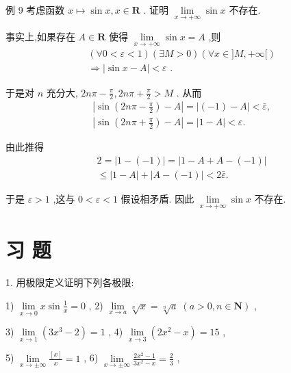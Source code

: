 例 9 考虑函数 $x \mapsto  \sin x,x \in  \mathbf{R}$ . 证明 $\mathop{\lim }\limits_{{x \rightarrow   + \infty }}\sin x$ 不存在.

事实上,如果存在 $A \in  \mathbf{R}$ 使得 $\mathop{\lim }\limits_{{x \rightarrow   + \infty }}\sin x = A$ ,则
\begin{align*}
	&\left( {\forall 0 < \varepsilon  < 1}\right) \left( {\exists M > 0}\right) \left( {\forall x \in  \rbrack M, + \infty \lbrack }\right)\\
	&\Rightarrow  \left| {\sin x - A}\right|  < \varepsilon \text{ . }
\end{align*}

于是对 $n$ 充分大, ${2n\pi } - \frac{\pi }{2},{2n\pi } + \frac{\pi }{2} > M$ . 从而
\begin{align*}
	&\left| {\sin \left( {{2n\pi } - \frac{\pi }{2}}\right)  - A}\right|  = \left| {\left( {-1}\right)  - A}\right|  < \bar{\varepsilon },\\
	&\left| {\sin \left( {{2n\pi } + \frac{\pi }{2}}\right)  - A}\right|  = \left| {1 - A}\right|  < \varepsilon .
\end{align*}

由此推得
\begin{align*}
	&2 = \left| {1 - \left( {-1}\right) }\right|  = \left| {1 - A + A - \left( {-1}\right) }\right|\\
	&\leq  \left| {1 - A}\right|  + \left| {A - \left( {-1}\right) }\right|  < 2\bar{\varepsilon }.
\end{align*}

于是 $\varepsilon  > 1$ ,这与 $0 < \varepsilon  < 1$ 假设相矛盾. 因此 $\mathop{\lim }\limits_{{x \rightarrow   + \infty }}\sin x$ 不存在.

\section*{习 题}

1. 用极限定义证明下列各极限:

1) $\mathop{\lim }\limits_{{x \rightarrow  0}}x\sin \frac{1}{x} = 0$ , 2) $\mathop{\lim }\limits_{{x \rightarrow  a}}\sqrt[n]{x} = \sqrt[n]{a}\;\left( {a > 0,n \in  \mathbf{N}}\right)$ ,

3) $\mathop{\lim }\limits_{{x \rightarrow  1}}\left( {3{x}^{3} - 2}\right)  = 1$ , 4) $\mathop{\lim }\limits_{{x \rightarrow  3}}\left( {2{x}^{2} - x}\right)  = {15}$ ,

5) $\mathop{\lim }\limits_{{x \rightarrow   \pm  \infty }}\frac{\left\lbrack  x\right\rbrack  }{x} = 1$ , 6) $\mathop{\lim }\limits_{{x \rightarrow   \pm  \infty }}\frac{2{x}^{2} - 1}{3{x}^{2} - x} = \frac{2}{3}$ ,

